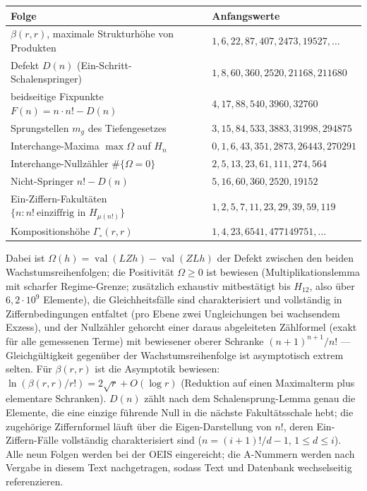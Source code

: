 \documentclass[11pt]{article}
\theoremstyle{definition}
\theoremstyle{remark}
\newcommand{\val}{\operatorname{val}}
\begin{document}
\begin{center}
\begin{tabular}{ll}
\toprule
Folge & Anfangswerte\\
\midrule
$\beta(r,r)$, maximale Strukturhöhe von Produkten &
$1,6,22,87,407,2473,19527,\dots$\\
Defekt $D(n)$ (Ein-Schritt-Schalenspringer) &
$1,8,60,360,2520,21168,211680$\\
beidseitige Fixpunkte $F(n)=n\cdot n!-D(n)$ &
$4,17,88,540,3960,32760$\\
Sprungstellen $m_g$ des Tiefengesetzes &
$3,15,84,533,3883,31998,294875$\\
Interchange-Maxima $\max\Omega$ auf $H_n$ &
$0,1,6,43,351,2873,26443,270291$\\
Interchange-Nullzähler $\#\{\Omega=0\}$ &
$2,5,13,23,61,111,274,564$\\
Nicht-Springer $n!-D(n)$ &
$5,16,60,360,2520,19152$\\
Ein-Ziffern-Fakultäten $\{n: n!\ \text{einziffrig in } H_{\mu(n!)}\}$ &
$1,2,5,7,11,23,29,39,59,119$\\
Kompositionshöhe $\Gamma_\circ(r,r)$ &
$1,4,23,6541,477149751,\dots$\\
\bottomrule
\end{tabular}
\end{center}

Dabei ist $\Omega(h)=\val(LZh)-\val(ZLh)$ der Defekt zwischen den
beiden Wachstumsreihenfolgen; die Positivität $\Omega\ge0$ ist
bewiesen (Multiplikationslemma mit scharfer Regime-Grenze; zusätzlich
exhaustiv mitbestätigt bis $H_{12}$, also über $6{,}2\cdot10^9$
Elemente), die
Gleichheitsfälle sind charakterisiert und vollständig in
Ziffernbedingungen entfaltet (pro Ebene zwei Ungleichungen bei
wachsendem Exzess), und der Nullzähler gehorcht einer daraus
abgeleiteten Zählformel (exakt für alle gemessenen Terme) mit
bewiesener oberer Schranke $(n{+}1)^{n+1}/n!$ — Gleichgültigkeit
gegenüber der Wachstumsreihenfolge ist asymptotisch extrem selten. Für
$\beta(r,r)$ ist die Asymptotik bewiesen:
$\ln(\beta(r,r)/r!)=2\sqrt r+O(\log r)$ (Reduktion auf einen
Maximalterm plus elementare Schranken). $D(n)$ zählt nach dem Schalensprung-Lemma
genau die Elemente, die eine einzige führende Null in die nächste
Fakultätsschale hebt; die zugehörige Ziffernformel läuft über die
Eigen-Darstellung von $n!$, deren Ein-Ziffern-Fälle vollständig
charakterisiert sind ($n=(i{+}1)!/d-1$, $1\le d\le i$). Alle neun Folgen werden bei der OEIS
eingereicht; die A-Nummern werden nach Vergabe in diesem Text
nachgetragen, sodass Text und Datenbank wechselseitig
referenzieren.
\end{document}
